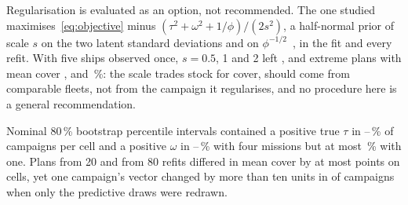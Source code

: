 Regularisation is evaluated as an option, not recommended. The one studied
maximises~\eqref{eq:objective} minus $(\tau^2+\omega^2+1/\phi)/(2s^2)$, a
half-normal prior of scale $s$ on the two latent standard deviations and on
$\phi^{-1/2}$~\cite{gelman2006}, in the fit and every refit. With five ships
observed once, $s=0.5$, 1 and 2 left \rgPenHalfBig, \rgPenOneBig{} and
\rgPenTwoBig{} extreme plans with mean cover \rgPenHalfCov, \rgPenOneCov{} and
\rgPenTwoCov\,\%: the scale trades stock for cover, should come from
comparable fleets, not from the campaign it regularises, and no procedure here
is a general recommendation.

Nominal 80\,\% bootstrap percentile intervals contained a positive true $\tau$
in \cvTauLo--\cvTauHi\,\% of campaigns per cell and a positive $\omega$ in
\cvOmLo--\cvOmHi\,\% with four missions but at most \cvOmOneHi\,\% with one.
Plans from 20 and from 80 refits differed in mean cover by at most
\bcDiffMax{} points on \bcCells{} cells, yet one campaign's vector changed by
more than ten units in \bcRedrawTen{} of \bcN{} campaigns when only the
predictive draws were redrawn.
